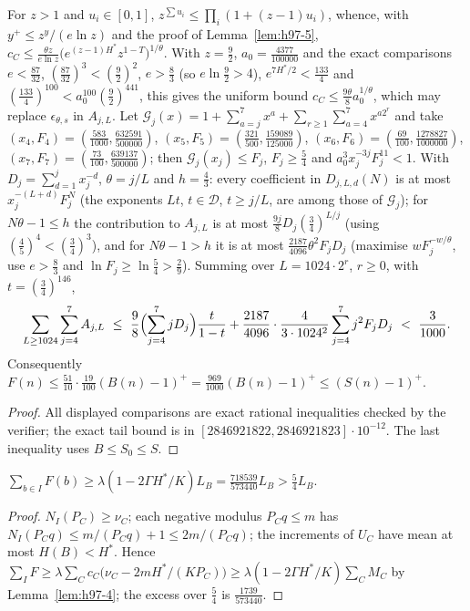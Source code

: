 \begin{lemma}\label{lem:h97-8}
For $z>1$ and $u_i\in[0,1]$, $z^{\sum u_i}\le\prod_i(1+(z-1)u_i)$, whence, with $y^+\le z^y/(e\ln z)$ and the proof of
Lemma~\ref{lem:h97-5}, $c_C\le\frac{\theta z}{e\ln z}\bigl(e^{(z-1)H^*}z^{1-T}\bigr)^{1/\theta}$. With $z=\tfrac92$,
$a_0=\tfrac{4377}{100000}$ and the exact comparisons $e<\tfrac{87}{32}$, $(\tfrac{87}{32})^3<(\tfrac92)^2$,
$e>\tfrac83$ (so $e\ln\tfrac92>4$), $e^{7H^*/2}<\tfrac{133}4$ and $(\tfrac{133}4)^{100}<a_0^{100}(\tfrac92)^{441}$,
this gives the uniform bound $c_C\le\tfrac{9\theta}8a_0^{1/\theta}$, which may replace $\epsilon_{\theta,s}$ in
$A_{j,L}$. Let $\mathcal G_j(x)=1+\sum_{a=j}^7x^a+\sum_{r\ge1}\sum_{a=4}^7x^{a2^r}$ and take
$(x_4,F_4)=(\tfrac{583}{1000},\tfrac{632591}{500000})$, $(x_5,F_5)=(\tfrac{321}{500},\tfrac{159089}{125000})$,
$(x_6,F_6)=(\tfrac{69}{100},\tfrac{1278827}{1000000})$, $(x_7,F_7)=(\tfrac{73}{100},\tfrac{639137}{500000})$; then
$\mathcal G_j(x_j)\le F_j$, $F_j\ge\tfrac54$ and $a_0^3x_j^{-3j}F_j^{11}<1$. With $D_j=\sum_{d=1}^jx_j^{-d}$,
$\theta=j/L$ and $h=\tfrac43$: every coefficient in $D_{j,L,d}(N)$ is at most $x_j^{-(L+d)}F_j^N$ (the exponents
$Lt$, $t\in\mathcal D$, $t\ge j/L$, are among those of $\mathcal G_j$); for $N\theta-1\le h$ the contribution to
$A_{j,L}$ is at most $\tfrac{9j}8D_j(\tfrac34)^{L/j}$ (using $(\tfrac45)^4<(\tfrac34)^3$), and for $N\theta-1>h$ it
is at most $\tfrac{2187}{4096}\theta^2F_jD_j$ (maximise $wF_j^{-w/\theta}$, use $e>\tfrac83$ and
$\ln F_j\ge\ln\tfrac54>\tfrac29$). Summing over $L=1024\cdot2^r$, $r\ge0$, with $t=(\tfrac34)^{146}$,
\[
\sum_{L\ge1024}\sum_{j=4}^7A_{j,L}\ \le\ \frac98\Bigl(\sum_{j=4}^7jD_j\Bigr)\frac t{1-t}
+\frac{2187}{4096}\cdot\frac4{3\cdot1024^2}\sum_{j=4}^7j^2F_jD_j\ <\ \frac3{1000}.
\]
Consequently $F(n)\le\tfrac{51}{10}\cdot\tfrac{19}{100}(B(n)-1)^+=\tfrac{969}{1000}(B(n)-1)^+\le(S(n)-1)^+$.
\end{lemma}
\begin{proof}
All displayed comparisons are exact rational inequalities checked by the verifier; the exact tail bound is in
$[2846921822,2846921823]\cdot10^{-12}$. The last inequality uses $B\le S_0\le S$.
\end{proof}

\begin{lemma}\label{lem:h97-9}
$\sum_{b\in I}F(b)\ge\lambda(1-2\Gamma H^*/K)L_B=\tfrac{718539}{573440}L_B>\tfrac54L_B$.
\end{lemma}
\begin{proof}
$N_I(P_C)\ge\nu_C$; each negative modulus $P_Cq\le m$ has $N_I(P_Cq)\le m/(P_Cq)+1\le2m/(P_Cq)$; the increments of
$U_C$ have mean at most $H(B)<H^*$. Hence
$\sum_IF\ge\lambda\sum_Cc_C\bigl(\nu_C-2mH^*/(KP_C)\bigr)\ge\lambda(1-2\Gamma H^*/K)\sum_CM_C$ by
Lemma~\ref{lem:h97-4}; the excess over $\tfrac54$ is $\tfrac{1739}{573440}$.
\end{proof}


